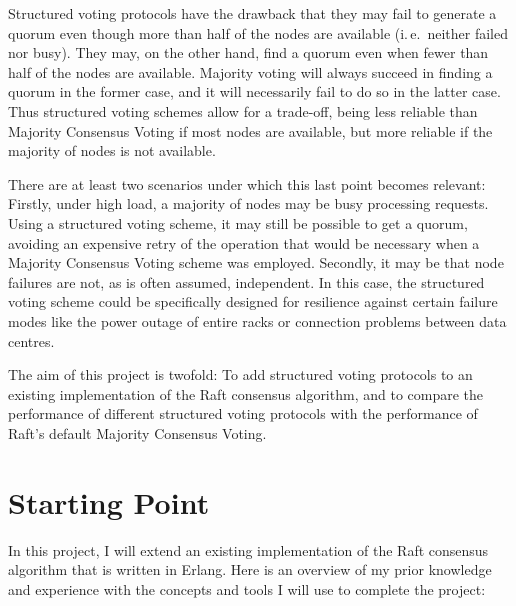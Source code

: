 \documentclass[12pt]{scrartcl}
\begin{document}
Structured voting protocols have the drawback that they may fail to generate a quorum even though more than half of the nodes are available (i.\,e.\ neither failed nor busy). They may, on the other hand, find a quorum even when fewer than half of the nodes are available. Majority voting will always succeed in finding a quorum in the former case, and it will necessarily fail to do so in the latter case. Thus structured voting schemes allow for a trade-off, being less reliable than Majority Consensus Voting if most nodes are available, but more reliable if the majority of nodes is not available.

There are at least two scenarios under which this last point becomes relevant: Firstly, under high load, a majority of nodes may be busy processing requests. Using a structured voting scheme, it may still be possible to get a quorum, avoiding an expensive retry of the operation that would be necessary when a Majority Consensus Voting scheme was employed. Secondly, it may be that node failures are not, as is often assumed, independent. In this case, the structured voting scheme could be specifically designed for resilience against certain failure modes like the power outage of entire racks or connection problems between data centres.

The aim of this project is twofold: To add structured voting protocols to an existing implementation of the Raft consensus algorithm, and to compare the performance of different structured voting protocols with the performance of Raft's default Majority Consensus Voting.


\section{Starting Point%
  \label{starting-point}%
}
%

In this project, I will extend an existing implementation of the Raft consensus algorithm that is written in Erlang. Here is an overview of my prior knowledge and experience with the concepts and tools I will use to complete the project:
\end{document}
